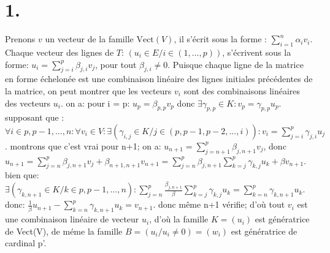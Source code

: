\documentclass{article}
\begin{document}
\section*{1.}
Prenons $v$ un vecteur de la famille $\text{Vect}(V)$, il s'écrit sous la forme : $\sum_{i=1}^{n}\alpha_{i}v_{i}$.
Chaque vecteur des lignes de $T$: $(u_i \in E/i \in (1,...,p))$, s'écrivent sous la forme: $u_i = \sum_{j=i}^{p}\beta_{j,i}v_j$, pour tout $\beta_{j,i} \neq 0$. Puisque chaque ligne de la matrice en forme échelonée est une combinaison linéaire des lignes initiales précédentes de la matrice, on peut montrer que les vecteurs $v_i$ sont des combinaisons linéaires des vecteurs $u_i$.\newline
on a: pour i = p: $u_p = \beta_{p,p}v_p$ donc $\exists\gamma_{p,p}\in{K}: v_p = \gamma_{p,p}u_p$.\newline
supposant que :$\forall i \in{p,p-1,...,n} :\forall{v_i}\in{V}:\exists{(\gamma_{i,j}\in K/j\in(p,p-1,p-2,...,i))} : v_i = \sum_{j=i}^{p}\gamma_{j,i}u_j$.\newline
montrons que c'est vrai pour n+1;\newline
on a: $u_{n+1}=\sum_{j=n+1}^{p}\beta_{j,n+1}v_j$, donc $u_{n+1} = \sum_{j=n}^{p}\beta_{j,n+1}v_j + \beta_{n+1,n+1}v_{n+1} = \sum_{j=n}^{p}\beta_{j,n+1}\sum_{k=j}^{p}\gamma_{k,j}u_k + \beta v_{n+1}$.\newline
bien que:\newline
$\exists{(\gamma_{k,n+1}\in{K}/k\in{p,p-1,...,n})} : \sum_{j=n}^{p}\frac{\beta_{j,n+1}}{\beta}\sum_{k=j}^{p}\gamma_{k,j}u_k  = \sum_{k=n}^{p}\gamma_{k,n+1}u_k$.\newline
donc: $\frac{1}{\beta}u_{n+1} - \sum_{k=n}^{p}\gamma_{k,n+1}u_k = v_{n+1}$.\newline
donc même n+1 vérifie;\newline
d'où tout $v_i$ est une combinaison linéaire de vecteur $u_i$, d'où la famille $K = (u_i)$ est génératrice de Vect(V), de méme la famille $B = (u_i/u_i \neq 0) = (w_i)$ est génératrice de cardinal p'.\newline\newline
\end{document}
